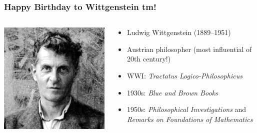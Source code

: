 \begin{frame}
  \frametitle{Happy Birthday to Wittgenstein tm!}

  \begin{columns}
    \begin{column}{.35\textwidth}
      \includegraphics[height=.6\textheight]{../assets/Wittgenstein}
    \end{column}
    \begin{column}{.7\textwidth}
      \begin{itemize}[<+->]
        \item Ludwig Wittgenstein (1889--1951)
                
        \item Austrian philosopher (most influential of 20th century!) 
        
        \item WWI: \textit{Tractatus Logico-Philosophicus}
        
        \item 1930s: \textit{Blue and Brown Books}
        
        \item 1950s: \textit{Philosophical Investigations} and \textit{Remarks on Foundations of Mathematics}
        
     
      \end{itemize}
    \end{column}
  \end{columns}
\end{frame}

